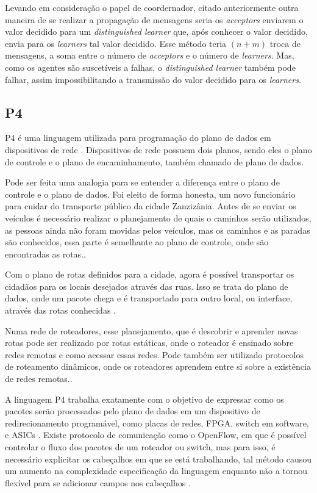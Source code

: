 \documentclass[
    12pt,
    openright, 
    oneside,
    a4paper,
    french,
    english,
    brazil
    ]{facom-ufu-abntex2}
\theoremstyle{definition}
\begin{document}
Levando em consideração o papel de coordernador, citado anteriormente outra maneira de se 
realizar a propagação de mensagens seria os \emph{acceptors} enviarem o valor decidido para um
\emph{distinguished learner} que, após conhecer o valor decidido, envia para os
\emph{learners} tal valor decidido. Esse método teria $(n + m)$ troca de mensagens,
a soma entre o número de \emph{acceptors} e o número de \emph{learners}. Mas, como os
agentes são suscetíveis a falhas, o \emph{distinguished learner} também pode falhar,
assim impossibilitando a transmissão do valor decidido para os \emph{learners}.

\subsection{P4}
P4 é uma linguagem utilizada para programação do plano de dados em  dispositivos de 
rede \cite{paxos16spec}. Dispositivos de rede possuem dois planos, sendo eles o 
plano de controle e o plano de encaminhamento, também chamado de plano de dados. 

Pode ser feita uma analogia para se entender a diferença entre o 
plano de controle e o plano de dados. Foi eleito de forma honesta, um novo 
funcionário para cuidar do transporte público da cidade Zanzizânia. Antes de se 
enviar os veículos é necessário realizar o planejamento de quais o caminhos serão
utilizados, as pessoas ainda não foram movidas pelos veículos, mas os caminhos 
e as paradas são conhecidos, essa parte é semelhante ao plano de controle, onde 
são encontradas as rotas.\cite{dataVsControl}. 

Com o plano de rotas definidos para a cidade, agora é possível transportar os cidadãos
para os locais desejados através das ruas. Isso se trata do plano de dados, onde 
um pacote chega e é transportado para outro local, ou interface, através das rotas 
conhecidas \cite{dataVsControl}.

Numa rede de roteadores, esse planejamento, que é descobrir e aprender novas rotas 
pode ser realizado por rotas estáticas, onde o roteador é ensinado sobre redes remotas
e como acessar essas redes. Pode também ser utilizado protocolos de roteamento dinâmicos,
onde os roteadores aprendem entre si sobre a existência de redes remotas.\cite{dataVsControl}.

A linguagem P4 trabalha exatamente com o objetivo de expressar como os pacotes serão 
processados pelo plano de dados em um dispositivo de redirecionamento programável, 
como placas de redes, FPGA, switch em software, e ASICs \cite{paxos16spec}. Existe 
protocolo de comunicação como o OpenFlow, em que é possível controlar o fluxo dos 
pacotes de um roteador ou switch, mas para isso, é necessário explicitar os 
cabeçalhos em que se está trabalhando, tal método causou um aumento na complexidade 
especificação da linguagem enquanto não a tornou flexível para se adicionar campos 
nos cabeçalhos \cite{bosshart2014p4}.
\end{document}
